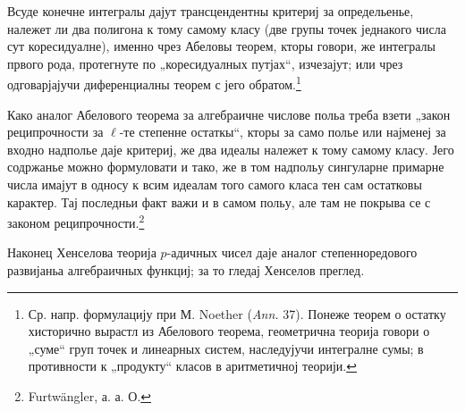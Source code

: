 ﻿\documentclass[11pt]{article}
\begin{document}
Всуде конечне интегралы дајут трансцендентны критериј за определьенье, належет ли два полигона к тому самому класу (две групы точек једнакого числа сут коресидуалне), именно чрез Абеловы теорем, кторы говори, же интегралы првого рода, протегнуте по „коресидуалных путјах“, изчезајут; или чрез одговарјајучи диференциалны теорем с јего обратом.\footnote{Ср. напр. формулацију при М. Noether (\emph{Ann.} 37). Понеже теорем о остатку хисторично вырастл из Абелового теорема, геометрична теорија говори о „суме“ груп точек и линеарных систем, наследујучи интегралне сумы; в противности к „продукту“ класов в аритметичној теорији.}

Како аналог Абелового теорема за алгебраичне числове польа треба взети „закон реципрочности за \(\ell\)-те степенне остаткы“, кторы за само полье или најменеј за входно надполье даје критериј, же два идеалы належет к тому самому класу. Јего содржанье можно формуловати и тако, же в том надпольу сингуларне примарне числа имајут в односу к всим идеалам того самого класа тен сам остатковы карактер. Тај последньи факт важи и в самом польу, але там не покрыва се с законом реципрочности.\footnote{Furtwängler, а. а. О.}

Наконец Хенселова теорија \(p\)-адичных чисел даје аналог степенноредового развијаньа алгебраичных функциј; за то гледај Хенселов преглед.
\end{document}
